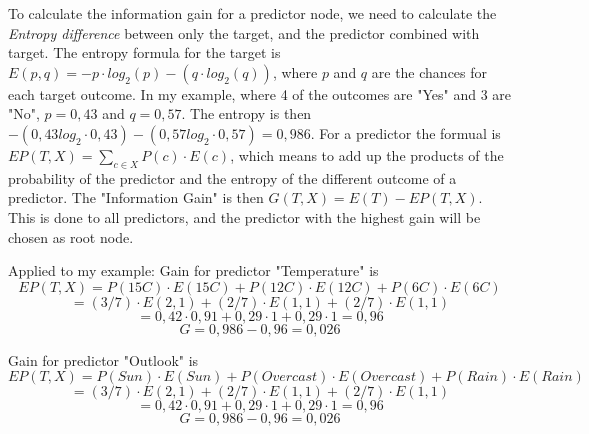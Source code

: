 To calculate the information gain for a predictor node, we need to calculate the \textit{Entropy difference} between only the target, and the predictor combined with target.
The entropy formula for the target is \\$ E(p, q) = -p \cdot log_{2}(p) - (q \cdot log_{2}(q)) $, where $ p $ and $ q $ are the chances for each target outcome. 
In my example, where 4 of the outcomes are "Yes" and 3 are "No", $ p = 0,43 $ and $ q = 0,57 $. The entropy is then \\
$ -(0,43 log_{2} \cdot 0,43) - (0,57 log_{2} \cdot 0,57) = 0,986 $. For a predictor the formual is $ EP(T, X) = \sum_{c \in X} P(c) \cdot E(c) $, 
which means to add up the products of the probability of the predictor and the entropy of the different outcome of a predictor. The "Information Gain" is
then $ G(T, X) = E(T) - EP(T, X) $. This is done to all predictors, and the predictor with the highest gain will be chosen as root node. 

\newpage
Applied to my example: 
Gain for predictor "Temperature" is 
\[ EP(T, X) = P(15C) \cdot E(15C) + P(12C) \cdot E(12C) + P(6C) \cdot E(6C) \] 
\[ = (3/7) \cdot E(2, 1) + (2/7) \cdot E(1, 1) + (2/7) \cdot E(1, 1) \]
\[ = 0,42 \cdot 0,91 + 0,29 \cdot 1 + 0,29 \cdot 1 = 0,96 \]
\[ G = 0,986 - 0,96 = 0,026 \]

Gain for predictor "Outlook" is 
\[ EP(T, X) = P(Sun) \cdot E(Sun) + P(Overcast) \cdot E(Overcast) + P(Rain) \cdot E(Rain) \] 
\[ = (3/7) \cdot E(2, 1) + (2/7) \cdot E(1, 1) + (2/7) \cdot E(1, 1) \]
\[ = 0,42 \cdot 0,91 + 0,29 \cdot 1 + 0,29 \cdot 1 = 0,96 \]
\[ G = 0,986 - 0,96 = 0,026 \]